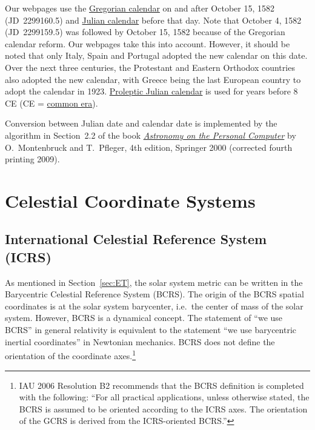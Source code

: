 \documentclass[12pt]{article}
\begin{document}
Our webpages use the \href{https://en.wikipedia.org/wiki/Gregorian_calendar}{Gregorian calendar} 
on and after October 15, 1582 (JD~2299160.5) and 
\href{https://en.wikipedia.org/wiki/Julian_calendar}{Julian calendar} before that day. 
Note that October 4, 1582 (JD~2299159.5) was followed by October 15, 1582 because 
of the Gregorian calendar reform. Our webpages take this into account. 
However, it should be noted that only Italy, Spain and Portugal adopted 
the new calendar on this date. Over the next three centuries, the Protestant 
and Eastern Orthodox countries also adopted the new calendar, with Greece 
being the last European country to adopt the calendar in 1923. 
\href{https://en.wikipedia.org/wiki/Proleptic_Julian_calendar}{Proleptic Julian calendar} 
is used for years before 8 CE (CE = \href{https://en.wikipedia.org/wiki/Common_Era}{common 
era}).

Conversion between Julian date and calendar date is implemented by the algorithm 
in Section~2.2 of the book \href{https://www.springer.com/us/book/9783540672210#}
{\it Astronomy on the Personal Computer} by 
O.~Montenbruck and T.~Pfleger, 4th edition, Springer 2000 (corrected fourth 
printing 2009).

\section{Celestial Coordinate Systems}
\label{sec:coordSys}

\subsection{International Celestial Reference System (ICRS)} 

As mentioned in Section~\ref{sec:ET}, the solar system metric can be 
written in the Barycentric Celestial Reference System (BCRS). The origin of the 
BCRS spatial coordinates is at the solar system barycenter, i.e.\ the center 
of mass of the solar system. However, BCRS is a dynamical concept. The 
statement of ``we use BCRS'' in general relativity is equivalent to the 
statement ``we use barycentric inertial coordinates'' in Newtonian 
mechanics. BCRS does not define the orientation of the coordinate axes.\footnote{IAU 2006
Resolution B2 recommends that the BCRS definition is completed with the
following: ``For all practical applications, unless otherwise
stated, the BCRS is assumed to be oriented according to the ICRS axes.
The orientation of the GCRS is derived from the ICRS-oriented BCRS.''} 
\end{document}
